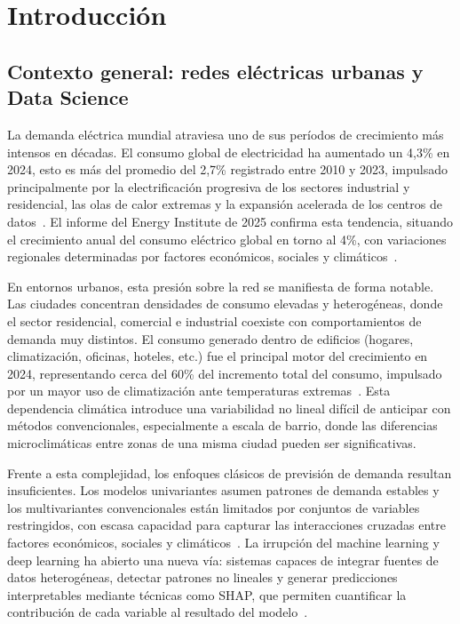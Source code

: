 \documentclass[12pt, a4paper]{article}
\begin{document}
\section{Introducción}

\subsection{Contexto general: redes eléctricas urbanas y Data Science}

La demanda eléctrica mundial atraviesa uno de sus períodos de crecimiento más intensos en décadas. El consumo global de electricidad ha aumentado un 4,3\% en 2024, esto es más del promedio del 2,7\% registrado entre 2010 y 2023, impulsado principalmente por la electrificación progresiva de los sectores industrial y residencial, las olas de calor extremas y la expansión acelerada de los centros de datos~\cite{iea2025}. El informe del Energy Institute de 2025 confirma esta tendencia, situando el crecimiento anual del consumo eléctrico global en torno al 4\%, con variaciones regionales determinadas por factores económicos, sociales y climáticos~\cite{eldakhakhni2026}.

En entornos urbanos, esta presión sobre la red se manifiesta de forma notable. Las ciudades concentran densidades de consumo elevadas y heterogéneas, donde el sector residencial, comercial e industrial coexiste con comportamientos de demanda muy distintos. El consumo generado dentro de edificios (hogares, climatización, oficinas, hoteles, etc.) fue el principal motor del crecimiento en 2024, representando cerca del 60\% del incremento total del consumo, impulsado por un mayor uso de climatización ante temperaturas extremas~\cite{iea2025}. Esta dependencia climática introduce una variabilidad no lineal difícil de anticipar con métodos convencionales, especialmente a escala de barrio, donde las diferencias microclimáticas entre zonas de una misma ciudad pueden ser significativas.

Frente a esta complejidad, los enfoques clásicos de previsión de demanda resultan insuficientes. Los modelos univariantes asumen patrones de demanda estables y los multivariantes convencionales están limitados por conjuntos de variables restringidos, con escasa capacidad para capturar las interacciones cruzadas entre factores económicos, sociales y climáticos~\cite{eldakhakhni2026}. La irrupción del machine learning y deep learning ha abierto una nueva vía: sistemas capaces de integrar fuentes de datos heterogéneas, detectar patrones no lineales y generar predicciones interpretables mediante técnicas como SHAP, que permiten cuantificar la contribución de cada variable al resultado del modelo~\cite{eldakhakhni2026}.
\end{document}
